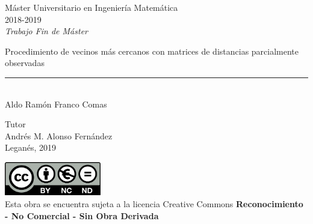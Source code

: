 \documentclass[12pt]{report} %
\theoremstyle{definition}
\begin{document}

\begin{titlepage}
	\begin{sffamily}
		\color{azulUC3M}
		\begin{center}
			\begin{figure}[H] %
			\end{figure}
			\vspace{1cm}
			\begin{Large}
				Máster Universitario en Ingeniería Matemática\\			
				2018-2019\\
				\vspace{1cm}		
				\textsl{Trabajo Fin de Máster}
				\bigskip
				
			\end{Large}
			{\Huge Procedimiento de vecinos más cercanos con matrices de distancias parcialmente observadas}\\
			\vspace*{0.5cm}
			\rule{10.5cm}{0.1mm}\\
			\vspace*{0.9cm}
			{\LARGE Aldo Ramón Franco Comas}\\ 
			\vspace*{1cm}
			\begin{Large}
				Tutor\\
				Andrés M. Alonso Fernández\\
				\vspace{2cm}
				Leganés, 2019\\
			\end{Large}
		\end{center}
		
		\vfill
		\color{black}
	
			\noindent\includegraphics[width=4.2cm]{imagenes/creativecommons.png}\\
			Esta obra se encuentra sujeta a la licencia Creative Commons \textbf{Reconocimiento - No Comercial - Sin Obra Derivada}
			
	\end{sffamily}
\end{titlepage}
\end{document}
